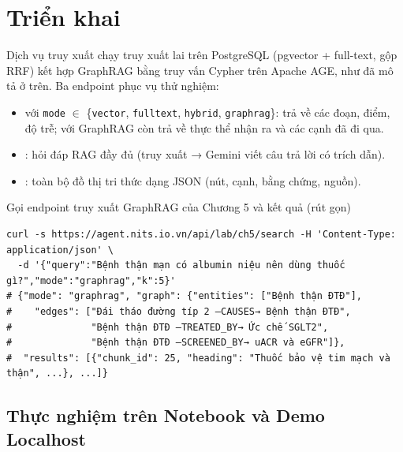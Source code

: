 \section{Triển khai}

Dịch vụ truy xuất chạy truy xuất lai trên PostgreSQL (pgvector + full-text, gộp RRF) kết hợp GraphRAG bằng truy vấn Cypher trên Apache AGE, như đã mô tả ở trên. Ba endpoint phục vụ thử nghiệm:
\begin{itemize}
  \item {} với \texttt{mode} $\in$ \{\texttt{vector}, \texttt{fulltext}, \texttt{hybrid}, \texttt{graphrag}\}: trả về các đoạn, điểm, độ trễ; với GraphRAG còn trả về thực thể nhận ra và các cạnh đã đi qua.
  \item {}: hỏi đáp RAG đầy đủ (truy xuất → Gemini viết câu trả lời có trích dẫn).
  \item {}: toàn bộ đồ thị tri thức dạng JSON (nút, cạnh, bằng chứng, nguồn).
\end{itemize}

\begin{code}{Gọi endpoint truy xuất GraphRAG của Chương 5 và kết quả (rút gọn)}
\label{lst:ch5-api}
\begin{verbatim}
curl -s https://agent.nits.io.vn/api/lab/ch5/search -H 'Content-Type: application/json' \
  -d '{"query":"Bệnh thận mạn có albumin niệu nên dùng thuốc gì?","mode":"graphrag","k":5}'
# {"mode": "graphrag", "graph": {"entities": ["Bệnh thận ĐTĐ"],
#    "edges": ["Đái tháo đường típ 2 —CAUSES→ Bệnh thận ĐTĐ",
#              "Bệnh thận ĐTĐ —TREATED_BY→ Ức chế SGLT2",
#              "Bệnh thận ĐTĐ —SCREENED_BY→ uACR và eGFR"]},
#  "results": [{"chunk_id": 25, "heading": "Thuốc bảo vệ tim mạch và thận", ...}, ...]}
\end{verbatim}
\end{code}

\subsection{Thực nghiệm trên Notebook và Demo Localhost}
\label{sec:ch5-notebook-demo}

